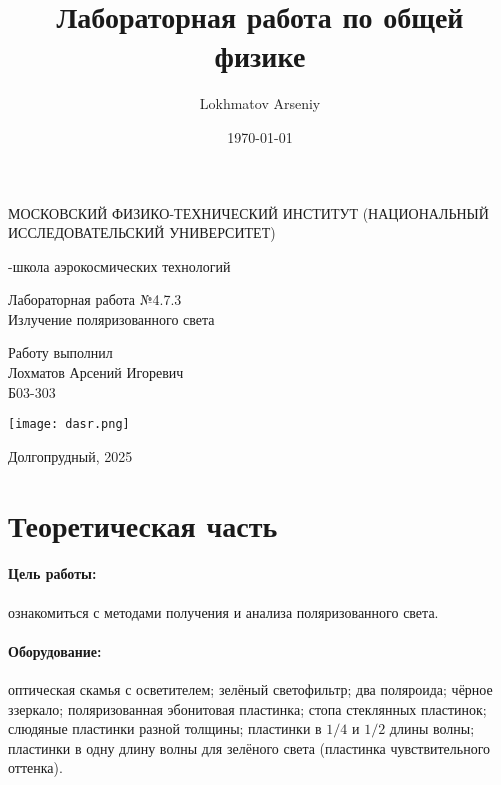 \documentclass[a4paper,12pt]{article} %
\author{Lokhmatov Arseniy}
\title{Лабораторная работа по общей физике}
\date{\today}
\begin{document}
\begin{titlepage}
    \newpage
    \begin{center}
    {\large МОСКОВСКИЙ ФИЗИКО-ТЕХНИЧЕСКИЙ ИНСТИТУТ (НАЦИОНАЛЬНЫЙ ИССЛЕДОВАТЕЛЬСКИЙ УНИВЕРСИТЕТ)}
    \vspace{1cm}

    {-школа аэрокосмических технологий}
    \vspace{6em}
    \end{center}
    
    \vspace{1.2em}

    \begin{center}
    \Large Лабораторная работа №4.7.3 \\
    Излучение поляризованного света
    \linebreak
    \end{center}
    
    \vspace{11em}
    
    \begin{flushright}
                       {\large Работу выполнил\\
                       Лохматов Арсений Игоревич\\
                       Б03-303 }
    \end{flushright}

    \vspace{\fill}

    \begin{center}
        \texttt{[image: dasr.png]}
    \end{center}

    \begin{center}
    Долгопрудный, 2025
    \end{center}

    \end{titlepage}

\section{Теоретическая часть}

\paragraph{Цель работы:} ознакомиться с методами получения и анализа поляризованного света.

\paragraph{Оборудование:} оптическая скамья с осветителем; зелёный светофильтр; два поляроида; чёрное ззеркало; поляризованная эбонитовая пластинка; стопа стеклянных пластинок; слюдяные пластинки разной толщины; пластинки в $1/4$ и $1/2$ длины волны; пластинки в одну длину волны для зелёного света (пластинка чувствительного оттенка).
\end{document}
